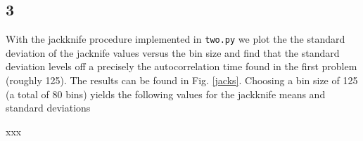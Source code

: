 \documentclass[singlepage,notitlepage,nofootinbib,11pt]{revtex4-1}
\begin{document}
\subsection{3}
With the jackknife procedure implemented in \verb|two.py| we plot the the standard deviation of the jacknife values versus the bin size and find that the standard deviation levels off a precisely the autocorrelation time found in the first problem (roughly 125). The results can be found in Fig. \ref{jacks}. Choosing a bin size of 125 (a total of 80 bins) yields the following values for the jackknife means and standard deviations
\begin{center}
\begin{tabular}
xxx
\end{tabular}
\end{center}
\begin{figure}[h]
\centering
  \captionsetup[subfigure]{labelformat=empty}
  \\
  \\

\end{figure}
\end{document}
